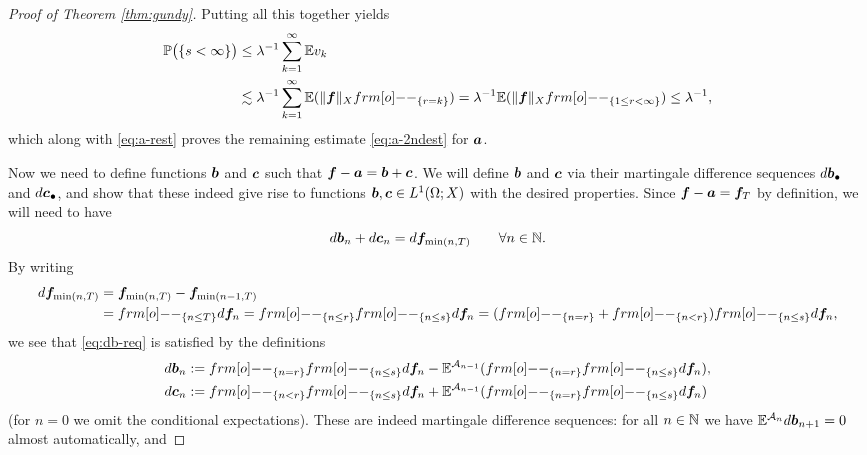 \begin{proof}[Proof of Theorem \ref{thm:gundy}]
  Putting all this together yields
  \begin{equation*}
    \begin{aligned}
      \P\big(\{s < \infty\}\big)
      &\leq \lambda^{-1} \sum_{k=1}^{\infty} \E v_{k} \\
      &\lesssim \lambda^{-1} \sum_{k=1}^{\infty} \E (\|\mb{f}\|_{X} \1_{\{r = k\}})
      = \lambda^{-1} \E(\|\mb{f}\|_{X} \1_{\{1 \leq r < \infty\}}) \leq \lambda^{-1},
    \end{aligned}
  \end{equation*}
  which along with \eqref{eq:a-rest} proves the remaining estimate \eqref{eq:a-2ndest} for $\bm{a}$.
  
  Now we need to define functions $\bm{b}$ and $\bm{c}$ such that $\bm{f} - \bm{a} = \bm{b} + \bm{c}$.
  We will define $\bm{b}$ and $\bm{c}$ via their martingale difference sequences $d\bm{b}_{\bullet}$ and $d\bm{c}_{\bullet}$, and show that these indeed give rise to functions $\bm{b}, \bm{c} \in L^1(\Omega;X)$ with the desired properties.
  Since $\bm{f} - \bm{a} = \bm{f}_{T}$ by definition, we will need to have
  \begin{equation}\label{eq:db-req}
    d\bm{b}_{n} + d\bm{c}_{n} = d\bm{f}_{\min(n,T)} \qquad \forall n \in \mathbb{N}.
  \end{equation}
  By writing
  \begin{equation*}
    \begin{aligned}
      d\mb{f}_{\min(n,T)}
      &= \mb{f}_{\min(n,T)} - \mb{f}_{\min(n-1,T)} \\
      &= \1_{\{n \leq T\}} d\mb{f}_{n} 
      = \1_{\{n \leq r\}} \1_{\{n \leq s\}} d\mb{f}_{n} 
      =  ( \1_{\{n = r\}} + \1_{\{n < r\}}) \1_{\{n \leq s\}} d\mb{f}_{n},
    \end{aligned}
  \end{equation*}
  we see that \eqref{eq:db-req} is satisfied by the definitions
  \begin{equation*}
    \begin{aligned}
      d\mb{b}_{n} &:= \1_{\{n = r\}} \1_{\{n \leq s\}} d\mb{f}_{n}  - \E^{\mc{A}_{n-1}} (\1_{\{n = r\}} \1_{\{n \leq s\}} d\mb{f}_{n} ), \\
      d\mb{c}_{n} &:= \1_{\{n < r\}} \1_{\{n \leq s\}} d\mb{f}_{n}  + \E^{\mc{A}_{n-1}} (\1_{\{n = r\}} \1_{\{n \leq s\}} d\mb{f}_{n} )
    \end{aligned}
  \end{equation*}
  (for $n = 0$ we omit the conditional expectations).
  These are indeed martingale difference sequences: for all $n \in \mathbb{N}$ we have $\mathbb{E}^{\mathcal{A}_{n}} d\bm{b}_{n+1} = 0$ almost automatically, and

\end{proof}
